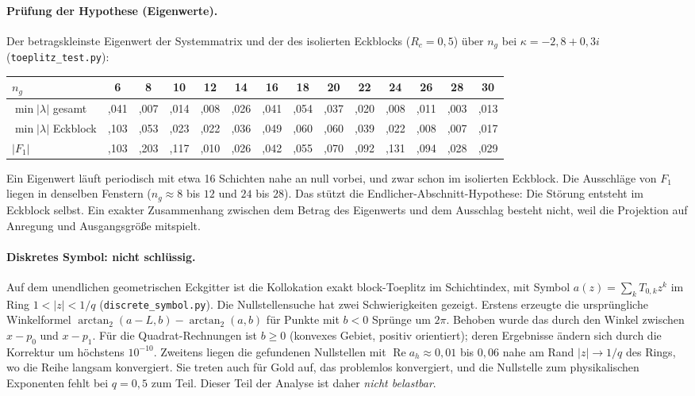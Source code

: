 \documentclass[11pt, a4paper]{article}
\theoremstyle{plain}
\theoremstyle{definition}
\begin{document}
\paragraph{Prüfung der Hypothese (Eigenwerte).} Der betragskleinste Eigenwert der
Systemmatrix und der des isolierten Eckblocks ($R_c=0{,}5$) über $n_g$ bei
$\kappa=-2{,}8+0{,}3i$ (\texttt{toeplitz\_test.py}):
\begin{center}\footnotesize\setlength{\tabcolsep}{3pt}
\begin{tabular}{lccccccccccccc}
\toprule
$n_g$ & 6 & 8 & 10 & 12 & 14 & 16 & 18 & 20 & 22 & 24 & 26 & 28 & 30\\
\midrule
$\min|\lambda|$ gesamt & ,041 & ,007 & ,014 & ,008 & ,026 & ,041 & ,054 & ,037 & ,020 & ,008 & ,011 & ,003 & ,013\\
$\min|\lambda|$ Eckblock & ,103 & ,053 & ,023 & ,022 & ,036 & ,049 & ,060 & ,060 & ,039 & ,022 & ,008 & ,007 & ,017\\
$|F_1|$ & ,103 & ,203 & ,117 & ,010 & ,026 & ,042 & ,055 & ,070 & ,092 & ,131 & ,094 & ,028 & ,029\\
\bottomrule
\end{tabular}
\end{center}
Ein Eigenwert läuft periodisch mit etwa 16 Schichten nahe an null vorbei, und zwar
schon im isolierten Eckblock. Die Ausschläge von $F_1$ liegen in denselben
Fenstern ($n_g\approx8$ bis $12$ und $24$ bis $28$). Das stützt die
Endlicher-Abschnitt-Hypothese: Die Störung entsteht im Eckblock selbst. Ein
exakter Zusammenhang zwischen dem Betrag des Eigenwerts und dem Ausschlag besteht
nicht, weil die Projektion auf Anregung und Ausgangsgröße mitspielt.

\paragraph{Diskretes Symbol: nicht schlüssig.} Auf dem unendlichen geometrischen
Eckgitter ist die Kollokation exakt block-Toeplitz im Schichtindex, mit Symbol
$a(z)=\sum_kT_{0,k}z^k$ im Ring $1<|z|<1/q$ (\texttt{discrete\_symbol.py}). Die
Nullstellensuche hat zwei Schwierigkeiten gezeigt. Erstens erzeugte die
ursprüngliche Winkelformel $\arctan_2(a-L,b)-\arctan_2(a,b)$ für Punkte mit
$b<0$ Sprünge um $2\pi$. Behoben wurde das durch den Winkel zwischen $x-p_0$ und
$x-p_1$. Für die Quadrat-Rechnungen ist $b\ge0$ (konvexes Gebiet, positiv
orientiert); deren Ergebnisse ändern sich durch die Korrektur um höchstens
$10^{-10}$. Zweitens liegen die gefundenen Nullstellen mit
$\operatorname{Re}a_h\approx0{,}01$ bis $0{,}06$ nahe am Rand $|z|\to1/q$ des
Rings, wo die Reihe langsam konvergiert. Sie treten auch für Gold auf, das
problemlos konvergiert, und die Nullstelle zum physikalischen Exponenten fehlt bei
$q=0{,}5$ zum Teil. Dieser Teil der Analyse ist daher \emph{nicht belastbar}.
\end{document}
